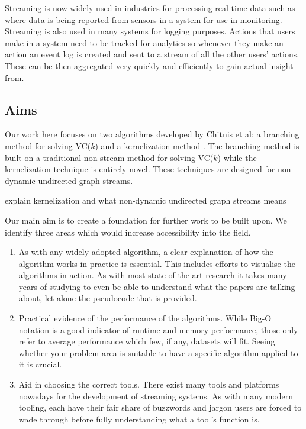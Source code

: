 Streaming is now widely used in industries for processing real-time data such
as where data is being reported from sensors in a system for use in monitoring.
Streaming is also used in many systems for logging purposes. Actions that users
make in a system need to be tracked for analytics so whenever they make an
action an event log is created and sent to a stream of all the other users'
actions. These can be then aggregated very quickly and efficiently to gain
actual insight from.

\subsection{Aims}

Our work here focuses on two algorithms developed by Chitnis et al: a branching
method for solving VC(\(k\)) \cite{chitnis2019towards} and a kernelization
method \cite{chitnis2015parameterized}. The branching method is built on a
traditional non-stream method for solving VC(\(k\)) while the kernelization
technique is entirely novel. These techniques are designed for non-dynamic
undirected graph streams.

explain kernelization and what non-dynamic undirected graph streams means

Our main aim is to create a foundation for further work to be built upon. We
identify three areas which would increase accessibility into the field.

\begin{enumerate}
    \item
          As with any widely adopted algorithm, a clear explanation of how the
          algorithm works in practice is essential. This includes efforts to
          visualise the algorithms in action. As with most state-of-the-art
          research it takes many years of studying to even be able to
          understand what the papers are talking about, let alone the
          pseudocode that is provided.
    \item
          Practical evidence of the performance of the algorithms. While Big-O
          notation is a good indicator of runtime and memory performance, those
          only refer to average performance which few, if any, datasets will
          fit. Seeing whether your problem area is suitable to have a specific
          algorithm applied to it is crucial.
    \item
          Aid in choosing the correct tools. There exist many tools and
          platforms nowadays for the development of streaming systems. As with
          many modern tooling, each have their fair share of buzzwords and
          jargon users are forced to wade through before fully understanding
          what a tool's function is.
\end{enumerate}

